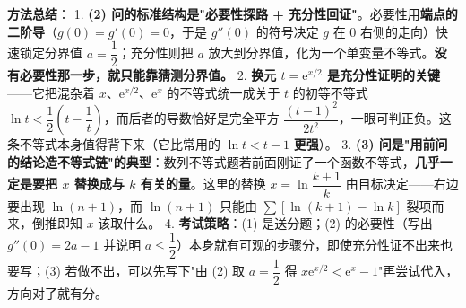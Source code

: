 \begin{answer}
\begin{gktip}
\textbf{方法总结}：
1. \textbf{(2) 问的标准结构是"必要性探路 + 充分性回证"}。必要性用\textbf{端点的二阶导}（$g(0)=g'(0)=0$，于是 $g''(0)$ 的符号决定 $g$ 在 $0$ 右侧的走向）快速锁定分界值 $a=\dfrac12$；充分性则把 $a$ 放大到分界值，化为一个单变量不等式。\textbf{没有必要性那一步，就只能靠猜测分界值。}
2. \textbf{换元 $t=\mathrm e^{x/2}$ 是充分性证明的关键}——它把混杂着 $x$、$\mathrm e^{x/2}$、$\mathrm e^{x}$ 的不等式统一成关于 $t$ 的初等不等式 $\ln t<\dfrac12\left(t-\dfrac1t\right)$，而后者的导数恰好是完全平方 $\dfrac{(t-1)^{2}}{2t^{2}}$，一眼可判正负。这条不等式本身值得背下来（它比常用的 $\ln t<t-1$ \textbf{更强}）。
3. \textbf{(3) 问是"用前问的结论造不等式链"的典型}：数列不等式题若前面刚证了一个函数不等式，\textbf{几乎一定是要把 $x$ 替换成与 $k$ 有关的量}。这里的替换 $x=\ln\dfrac{k+1}k$ 由目标决定——右边要出现 $\ln(n+1)$，而 $\ln(n+1)$ 只能由 $\sum\left[\ln(k+1)-\ln k\right]$ 裂项而来，倒推即知 $x$ 该取什么。
4. \textbf{考试策略}：(1) 是送分题；(2) 的必要性（写出 $g''(0)=2a-1$ 并说明 $a\le\dfrac12$）本身就有可观的步骤分，即使充分性证不出来也要写；(3) 若做不出，可以先写下"由 (2) 取 $a=\dfrac12$ 得 $x\mathrm e^{x/2}<\mathrm e^{x}-1$"再尝试代入，方向对了就有分。
\end{gktip}


\gkanswer{答案（2）：$a\le\dfrac12$，即 $\left(-\infty,\dfrac12\right]$}


\end{answer}